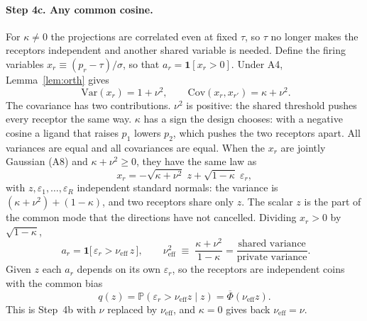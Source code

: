 \documentclass[11pt,a4paper]{article}
\newcommand{\PP}{\mathbb{P}}
\newcommand{\Var}{\mathrm{Var}}
\newcommand{\Cov}{\mathrm{Cov}}
\newcommand{\Phibar}{\overline{\Phi}}
\newcommand{\nueff}{\nu_{\mathrm{eff}}}
\begin{document}
\paragraph{Step 4c. Any common cosine.} For $\kappa\neq0$ the projections are correlated
even at fixed $\tau$, so $\tau$ no longer makes the receptors independent and another
shared variable is needed. Define the firing variables $x_r\equiv(p_r-\tau)/\sigma$, so
that $a_r=\mathbf 1[x_r>0]$. Under A4, Lemma~\ref{lem:orth} gives
\begin{equation}
  \boxed{\;\Var(x_r)=1+\nu^2,
  \qquad
  \Cov(x_r,x_{r'})=\kappa+\nu^2 .}
  \label{eq:sigmax}
\end{equation}
The covariance has two contributions. $\nu^2$ is positive: the shared threshold pushes
every receptor the same way. $\kappa$ has a sign the design chooses: with a negative
cosine a ligand that raises $p_1$ lowers $p_2$, which pushes the two receptors apart. All
variances are equal and all covariances are equal. When the $x_r$ are jointly Gaussian
(A8) and $\kappa+\nu^2\ge0$, they have the same law as
\begin{equation}
  x_r = -\sqrt{\kappa+\nu^2}\;z + \sqrt{1-\kappa}\;\varepsilon_r ,
  \label{eq:onefactor}
\end{equation}
with $z,\varepsilon_1,\dots,\varepsilon_R$ independent standard normals: the variance is
$(\kappa+\nu^2)+(1-\kappa)$, and two receptors share only $z$. The scalar $z$ is the part
of the common mode that the directions have not cancelled. Dividing $x_r>0$ by
$\sqrt{1-\kappa}$,
\begin{equation}
  \boxed{\;a_r=\mathbf 1\big[\,\varepsilon_r > \nueff\, z\,\big],
  \qquad
  \nueff^2 \;\equiv\; \frac{\kappa+\nu^2}{1-\kappa}
  = \frac{\text{shared variance}}{\text{private variance}} . }
  \label{eq:nueff}
\end{equation}
Given $z$ each $a_r$ depends on its own $\varepsilon_r$, so the receptors are independent
coins with the common bias
\begin{equation}
  q(z) = \PP(\varepsilon_r > \nueff z\mid z) = \Phibar(\nueff z).
  \label{eq:q}
\end{equation}
This is Step~4b with $\nu$ replaced by $\nueff$, and $\kappa=0$ gives back $\nueff=\nu$.
\end{document}
